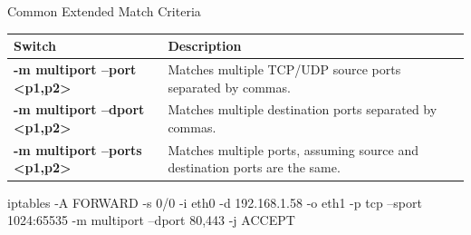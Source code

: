 \begin{frame}{Common Extended Match Criteria}
\centering\fontsize{11}{13}\selectfont
\renewcommand{\arraystretch}{1.25}
\begin{tabular}{|Y{4.9cm}|Y{7.6cm}|}\hline
{}\color{white}\bfseries Switch&\color{white}\bfseries Description\\\hline
\textcolor{CommandGreen}{\ttfamily\bfseries -m multiport --port <p1,p2>}&Matches multiple TCP/UDP source ports separated by commas.\\\hline
\textcolor{CommandGreen}{\ttfamily\bfseries -m multiport --dport <p1,p2>}&Matches multiple destination ports separated by commas.\\\hline
\textcolor{CommandGreen}{\ttfamily\bfseries -m multiport --ports <p1,p2>}&Matches multiple ports, assuming source and destination ports are the same.\\\hline
\end{tabular}
\vspace{0.25cm}
{\color{CommandGreen}\ttfamily\fontsize{10.5}{12.5}\selectfont iptables -A FORWARD -s 0/0 -i eth0 -d 192.168.1.58 -o eth1 -p tcp --sport 1024:65535 -m multiport --dport 80,443 -j ACCEPT\par}
\end{frame}
